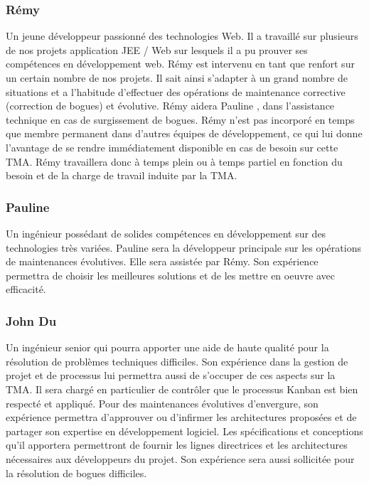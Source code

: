 \subsubsection{Rémy }
Un jeune développeur passionné des technologies Web. Il a travaillé sur plusieurs de nos projets application JEE / Web sur lesquels il a pu prouver ses compétences en développement web. Rémy est intervenu en tant que renfort sur un certain nombre de nos projets. Il sait ainsi s’adapter à un grand nombre de situations et a l’habitude d’effectuer des opérations de maintenance corrective (correction de bogues) et évolutive. Rémy  aidera Pauline , dans l’assistance technique en cas de surgissement de bogues. Rémy n’est pas incorporé en temps que membre permanent dans d’autres équipes de développement, ce qui lui donne l’avantage de se rendre immédiatement disponible en cas de besoin sur cette TMA. Rémy travaillera donc à temps plein ou à temps partiel en fonction du besoin et de la charge de travail induite par la TMA. 

\subsubsection{Pauline }
Un ingénieur possédant de solides compétences en développement sur des technologies très variées. Pauline sera la développeur principale sur les opérations de maintenances évolutives. Elle sera assistée par Rémy. Son expérience permettra de choisir les meilleures solutions et de les mettre en oeuvre avec efficacité. 

\subsubsection{John Du }
Un ingénieur senior qui pourra apporter une aide de haute qualité pour la résolution de problèmes techniques difficiles. Son expérience dans la gestion de projet et de processus lui permettra aussi de s’occuper de ces aspects sur la TMA. Il sera chargé en particulier de contrôler que le processus Kanban est bien respecté et appliqué. Pour des maintenances évolutives d’envergure, son expérience permettra d’approuver ou d’infirmer les architectures proposées et de partager son expertise en développement logiciel. Les spécifications et conceptions qu’il apportera permettront de fournir les lignes directrices et les architectures nécessaires aux développeurs du projet. Son expérience sera aussi sollicitée pour la résolution de bogues difficiles. 

